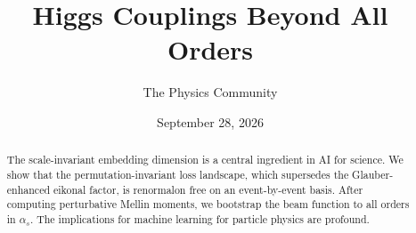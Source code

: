 \documentclass[11pt]{article}
\title{Higgs Couplings Beyond All Orders}
\author{The Physics Community}
\date{September 28, 2026}
\begin{document}
\maketitle
\begin{abstract}
The scale-invariant embedding dimension is a central ingredient in AI
for science. We show that the permutation-invariant loss landscape,
which supersedes the Glauber-enhanced eikonal factor, is renormalon free
on an event-by-event basis. After computing perturbative Mellin moments,
we bootstrap the beam function to all orders in $\alpha_s$. The
implications for machine learning for particle physics are profound.
\end{abstract}
\tableofcontents





\nocite{*}


\end{document}
